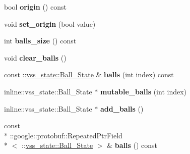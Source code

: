 \begin{DoxyCompactItemize}
\item 
\hypertarget{classvss__state_1_1Global__State_a5b09a31922fe8f976a7e21f2279a1364}{bool {\bfseries origin} () const }\label{classvss__state_1_1Global__State_a5b09a31922fe8f976a7e21f2279a1364}

\item 
\hypertarget{classvss__state_1_1Global__State_ac88223b795690cc57a71f24b315352fc}{void {\bfseries set\-\_\-origin} (bool value)}\label{classvss__state_1_1Global__State_ac88223b795690cc57a71f24b315352fc}

\item 
\hypertarget{classvss__state_1_1Global__State_a5010e0f86563f07ce75ed2138de96ae5}{int {\bfseries balls\-\_\-size} () const }\label{classvss__state_1_1Global__State_a5010e0f86563f07ce75ed2138de96ae5}

\item 
\hypertarget{classvss__state_1_1Global__State_a738a0947e2c3a450614579e1b7c008e4}{void {\bfseries clear\-\_\-balls} ()}\label{classvss__state_1_1Global__State_a738a0947e2c3a450614579e1b7c008e4}

\item 
\hypertarget{classvss__state_1_1Global__State_a6177a6bdab45c96d10c9f64371cd12af}{const \-::\hyperlink{classvss__state_1_1Ball__State}{vss\-\_\-state\-::\-Ball\-\_\-\-State} \& {\bfseries balls} (int index) const }\label{classvss__state_1_1Global__State_a6177a6bdab45c96d10c9f64371cd12af}

\item 
\hypertarget{classvss__state_1_1Global__State_a88e1c23a1561e6edeaa2c835ad5eb358}{inline\-::vss\-\_\-state\-::\-Ball\-\_\-\-State $\ast$ {\bfseries mutable\-\_\-balls} (int index)}\label{classvss__state_1_1Global__State_a88e1c23a1561e6edeaa2c835ad5eb358}

\item 
\hypertarget{classvss__state_1_1Global__State_aa02eca734a92c0f8352fc57dbda91e4e}{inline\-::vss\-\_\-state\-::\-Ball\-\_\-\-State $\ast$ {\bfseries add\-\_\-balls} ()}\label{classvss__state_1_1Global__State_aa02eca734a92c0f8352fc57dbda91e4e}

\item 
\hypertarget{classvss__state_1_1Global__State_a792da3990e724f225e585f3e099eab3c}{const \\*
\-::google\-::protobuf\-::\-Repeated\-Ptr\-Field\\*
$<$ \-::\hyperlink{classvss__state_1_1Ball__State}{vss\-\_\-state\-::\-Ball\-\_\-\-State} $>$ \& {\bfseries balls} () const }\label{classvss__state_1_1Global__State_a792da3990e724f225e585f3e099eab3c}


\end{DoxyCompactItemize}
